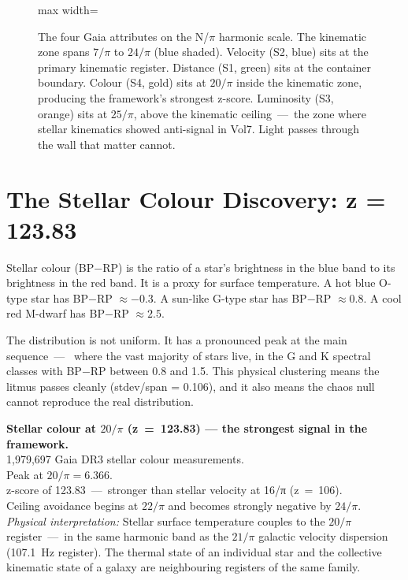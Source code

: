 \documentclass[11pt, letterpaper, openany]{book}
\begin{document}
\begin{figure}[H]
\begin{adjustbox}{max width=\textwidth}
\end{adjustbox}
\caption{The four Gaia attributes on the N/$\pi$ harmonic scale. The kinematic zone
spans $7/\pi$ to $24/\pi$ (blue shaded). Velocity (S2, blue) sits at the primary
kinematic register. Distance (S1, green) sits at the container boundary. Colour
(S4, gold) sits at $20/\pi$ inside the kinematic zone, producing the
framework's strongest z-score. Luminosity (S3, orange) sits at $25/\pi$, above the
kinematic ceiling~---~the zone where stellar kinematics showed anti-signal in Vol7.
Light passes through the wall that matter cannot.}
\label{fig:gaia_four_registers}
\end{figure}

\section{The Stellar Colour Discovery: z = 123.83}

Stellar colour (BP$-$RP) is the ratio of a star's brightness in the blue band to its
brightness in the red band. It is a proxy for surface temperature. A hot blue O-type
star has BP$-$RP $\approx -0.3$. A sun-like G-type star has BP$-$RP $\approx 0.8$.
A cool red M-dwarf has BP$-$RP $\approx 2.5$.

The distribution is not uniform. It has a pronounced peak at the main sequence~---~
where the vast majority of stars live, in the G and K spectral classes with
BP$-$RP between 0.8 and 1.5. This physical clustering means the litmus passes
cleanly (stdev/span = 0.106), and it also means the chaos null cannot reproduce
the real distribution.

\begin{signalbox}
\textbf{Stellar colour at $20/\pi$ (z~=~123.83) --- the strongest signal in the
framework.}\\[0.5em]
1,979,697 Gaia DR3 stellar colour measurements.\\
Peak at $20/\pi = 6.366$.\\
z-score of 123.83~---~stronger than stellar velocity at 16/π (z~=~106).\\
Ceiling avoidance begins at $22/\pi$ and becomes strongly negative by $24/\pi$.\\[0.5em]
\textit{Physical interpretation:} Stellar surface temperature couples to the
$20/\pi$ register~---~in the same harmonic band as the $21/\pi$ galactic velocity
dispersion (107.1~Hz register). The thermal state of an individual star and the
collective kinematic state of a galaxy are neighbouring registers of the same family.
\end{signalbox}
\end{document}
